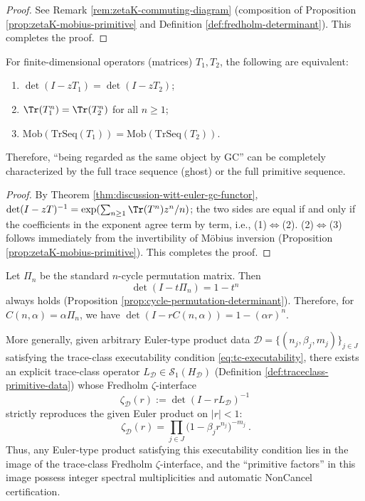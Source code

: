 \begin{proof}
See Remark \ref{rem:zetaK-commuting-diagram} (composition of Proposition \ref{prop:zetaK-mobius-primitive} and Definition \ref{def:fredholm-determinant}). This completes the proof.
\end{proof}

\begin{corollary}\label{cor:discussion-gc-equivalence-characterization}
For finite-dimensional operators (matrices) \(T_1,T_2\), the following are equivalent:
\begin{enumerate}
  \item \(\det(I-zT_1)=\det(I-zT_2)\);
  \item \(\Tr(T_1^n)=\Tr(T_2^n)\) for all \(n\ge 1\);
  \item \(\mathrm{Mob}(\mathrm{TrSeq}(T_1))=\mathrm{Mob}(\mathrm{TrSeq}(T_2))\).
\end{enumerate}
Therefore, ``being regarded as the same object by GC'' can be completely characterized by the full trace sequence (ghost) or the full primitive sequence.
\end{corollary}

\begin{proof}
By Theorem \ref{thm:discussion-witt-euler-gc-functor},
\(
\det(I-zT)^{-1}
=\exp(\sum_{n\ge 1}\Tr(T^n)z^n/n)
\);
the two sides are equal if and only if the coefficients in the exponent agree term by term, i.e., (1)\(\Longleftrightarrow\)(2).
(2)\(\Longleftrightarrow\)(3) follows immediately from the invertibility of M\"obius inversion (Proposition \ref{prop:zetaK-mobius-primitive}). This completes the proof.
\end{proof}

\begin{theorem}\label{thm:discussion-traceclass-fredholm-euler-surjection}
Let \(\Pi_n\) be the standard \(n\)-cycle permutation matrix. Then
\[
\det(I-t\Pi_n)=1-t^n
\]
always holds (Proposition \ref{prop:cycle-permutation-determinant}).
Therefore, for \(C(n,\alpha)=\alpha\Pi_n\), we have
\(\det(I-rC(n,\alpha))=1-(\alpha r)^n\).
\par
More generally, given arbitrary Euler-type product data \(\mathcal D=\{(n_j,\beta_j,m_j)\}_{j\in J}\) satisfying the trace-class executability condition \eqref{eq:tc-executability}, there exists an explicit trace-class operator \(L_{\mathcal D}\in\mathcal{S}_1(H_{\mathcal D})\) (Definition \ref{def:traceclass-primitive-data}) whose Fredholm \(\zeta\)-interface
\[
\zeta_{\mathcal D}(r):=\det(I-rL_{\mathcal D})^{-1}
\]
strictly reproduces the given Euler product on \(|r|<1\):
\[
\boxed{\ \zeta_{\mathcal D}(r)=\prod_{j\in J}\bigl(1-\beta_j r^{n_j}\bigr)^{-m_j}\ }.
\]
Thus, any Euler-type product satisfying this executability condition lies in the image of the trace-class Fredholm \(\zeta\)-interface, and the ``primitive factors'' in this image possess integer spectral multiplicities and automatic NonCancel certification.
\end{theorem}

